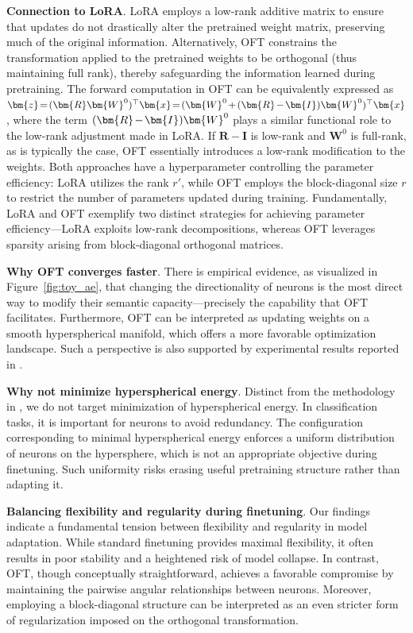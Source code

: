 \textbf{Connection to LoRA}. LoRA employs a low-rank additive matrix to ensure that updates do not drastically alter the pretrained weight matrix, preserving much of the original information. Alternatively, OFT constrains the transformation applied to the pretrained weights to be orthogonal (thus maintaining full rank), thereby safeguarding the information learned during pretraining. The forward computation in OFT can be equivalently expressed as $\thickmuskip=2mu \medmuskip=2mu \bm{z}=(\bm{R}\bm{W}^0)^\top\bm{x}=(\bm{W}^0+(\bm{R}-\bm{I})\bm{W}^0)^\top\bm{x}$, where the term $\thickmuskip=2mu \medmuskip=2mu (\bm{R}-\bm{I})\bm{W}^0$ plays a similar functional role to the low-rank adjustment made in LoRA. If $\bm{R}-\bm{I}$ is low-rank and $\bm{W}^0$ is full-rank, as is typically the case, OFT essentially introduces a low-rank modification to the weights. Both approaches have a hyperparameter controlling the parameter efficiency: LoRA utilizes the rank $r'$, while OFT employs the block-diagonal size $r$ to restrict the number of parameters updated during training. Fundamentally, LoRA and OFT exemplify two distinct strategies for achieving parameter efficiency—LoRA exploits low-rank decompositions, whereas OFT leverages sparsity arising from block-diagonal orthogonal matrices.

\textbf{Why OFT converges faster}. There is empirical evidence, as visualized in Figure~\ref{fig:toy_ae}, that changing the directionality of neurons is the most direct way to modify their semantic capacity—precisely the capability that OFT facilitates. Furthermore, OFT can be interpreted as updating weights on a smooth hyperspherical manifold, which offers a more favorable optimization landscape. Such a perspective is also supported by experimental results reported in \cite{liu2021orthogonal}.

\textbf{Why not minimize hyperspherical energy}. Distinct from the methodology in \cite{liu2021orthogonal}, we do not target minimization of hyperspherical energy. In classification tasks, it is important for neurons to avoid redundancy. The configuration corresponding to minimal hyperspherical energy enforces a uniform distribution of neurons on the hypersphere, which is not an appropriate objective during finetuning. Such uniformity risks erasing useful pretraining structure rather than adapting it.

\textbf{Balancing flexibility and regularity during finetuning}. Our findings indicate a fundamental tension between flexibility and regularity in model adaptation. While standard finetuning provides maximal flexibility, it often results in poor stability and a heightened risk of model collapse. In contrast, OFT, though conceptually straightforward, achieves a favorable compromise by maintaining the pairwise angular relationships between neurons. Moreover, employing a block-diagonal structure can be interpreted as an even stricter form of regularization imposed on the orthogonal transformation.

